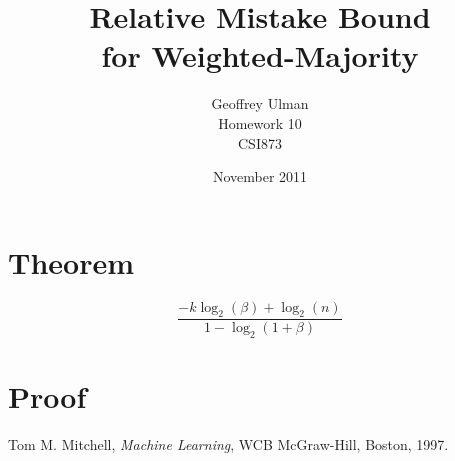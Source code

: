 \documentclass{article}
\begin{document}
\title{Relative Mistake Bound\\
       for Weighted-Majority}
\author{Geoffrey Ulman\\
        Homework 10\\
        CSI873}
\date{November 2011}
\maketitle

\section{Theorem}\label{Theorem}

\begin{equation}
\frac{-k \log _2 \left( \beta \right) + \log _2 \left( n \right)}{1 - \log _2 \left( 1 + \beta \right)}
\end{equation}

\section{Proof}\label{Proof}


\begin{thebibliography}{9}

  Tom M. Mitchell,
  \emph{Machine Learning},
  WCB McGraw-Hill, Boston,
  1997.

\end{thebibliography}
\end{document}
